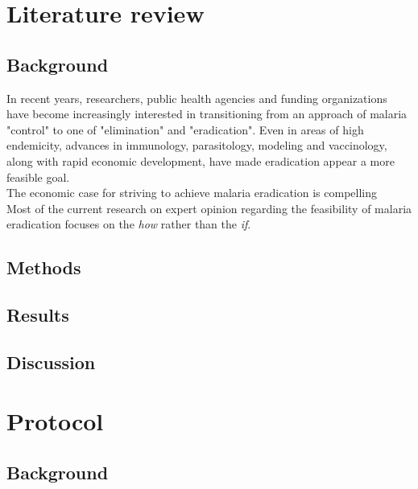 \documentclass{article}
\begin{document}
\section*{Literature review}


\subsection*{Background}

In recent years, researchers, public health agencies and funding organizations have become increasingly interested in transitioning from an approach of malaria "control" to one of "elimination" and "eradication".\cite{Tanner2015} Even in areas of high endemicity, advances in immunology, parasitology, modeling and vaccinology, along with rapid economic development, have made eradication appear a more feasible goal. \cite{Snow2015, Eckhoff2014}  \\

\noindent The economic case for striving to achieve malaria eradication is compelling \cite{Barofsky2015} \\

\noindent Most of the current research on expert opinion regarding the feasibility of malaria eradication focuses on the \emph{how} rather than the \emph{if}.\cite{Tanner2015} 

\subsection*{Methods}

\subsection*{Results}

\subsection*{Discussion}


\newpage
\section*{Protocol}


\subsection*{Background}
\end{document}
